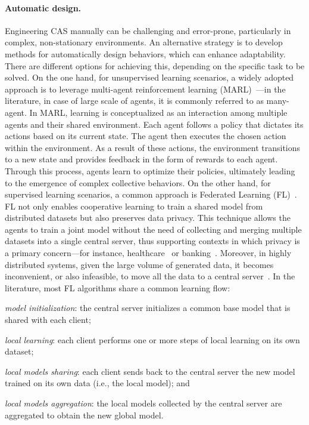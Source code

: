 \documentclass[12pt]{article}
\begin{document}
\paragraph{Automatic design.}
Engineering CAS manually can be challenging and error-prone, particularly in complex, 
 non-stationary environments. 
% 
An alternative strategy is to develop methods for automatically design 
 behaviors, which can enhance adaptability.
%
There are different options for achieving this, depending on the specific task to be solved. 
%
On the one hand, for unsupervised learning scenarios, a widely adopted approach is to leverage multi-agent 
 reinforcement learning (MARL)~\cite{DBLP:journals/corr/abs-1911-10635,DBLP:journals/tsmc/BusoniuBS08}---in the 
 literature, in case of large scale of agents, it is commonly referred to as many-agent. 
% 
In MARL, learning is conceptualized as an interaction among multiple agents and their shared environment. 
%
Each agent follows a policy that dictates its actions based on its current state. 
%
The agent then executes the chosen action within the environment. 
%
As a result of these actions, the environment transitions to a new state and provides feedback 
 in the form of rewards to each agent. 
% 
Through this process, agents learn to optimize their policies, ultimately leading to the 
 emergence of complex collective behaviors.
%
On the other hand, for supervised learning scenarios, a common approach is 
 Federated Learning (FL)~\cite{DBLP:conf/aistats/McMahanMRHA17}.
%
FL not only enables cooperative learning to train a shared model from distributed datasets
 but also preserves data privacy.
%
This technique allows the agents to train a joint model without the need of collecting and merging
 multiple datasets into a single central server, thus supporting contexts in which privacy is a primary 
 concern---for instance, healthcare~\cite{DBLP:journals/csur/NguyenPPDSLDH23} 
 or banking~\cite{DBLP:series/lncs/LongT0Z20}.
%
Moreover, in highly distributed systems, given the large volume of generated data, it becomes inconvenient, 
 or also infeasible, to move all the data to a central server~\cite{DBLP:journals/comsur/NguyenDPSLP21}.
%
In the literature, most FL algorithms share a common learning flow: 
 \begin{enumerate*}[label=(\roman*)]
	\item \emph{model initialization}: the central server initializes a common base model that is shared with each client;
	\item \emph{local learning}: each client performs one or more steps of local learning on its own dataset;
	\item \emph{local models sharing}: each client sends back to the central server the new model trained on its own data 
     (i.e., the local model); and
	\item \emph{local models aggregation}: the local models collected by the central server are aggregated to obtain the 
     new global model.
 \end{enumerate*}
\end{document}
